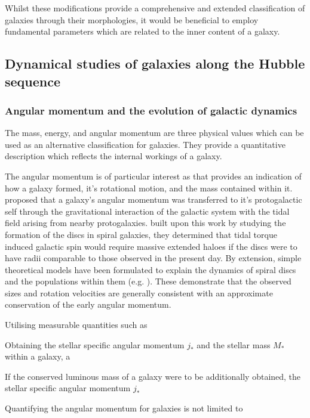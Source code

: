 \documentclass[12pt, twocolumn]{revtex4}    %
\begin{document}
Whilst these modifications provide a comprehensive and extended classification of galaxies through their morphologies, it would be beneficial to employ fundamental parameters which are related to the inner content of a galaxy.

\vspace{4ex}
\subsection{Dynamical studies of galaxies along the Hubble sequence}
\subsubsection{Angular momentum and the evolution of galactic dynamics}
\noindent
The mass, energy, and angular momentum are three physical values which can be used as an alternative classification for galaxies. They provide a quantitative description which reflects the internal workings of a galaxy.

The angular momentum is of particular interest as that provides an indication of how a galaxy formed, it's rotational motion, and the mass contained within it. \cite{1969ApJ...155..393P} proposed that a galaxy's angular momentum was transferred to it's protogalactic self through the gravitational interaction of the galactic system with the tidal field arising from nearby protogalaxies. \cite{1980MNRAS.193..189F} built upon this work by studying the formation of the discs in spiral galaxies, they determined that tidal torque induced galactic spin would require massive extended haloes if the discs were to have radii comparable to those observed in the present day. By extension, simple theoretical models have been formulated to explain the dynamics of spiral discs and the populations within them (e.g. \citealt{1998MNRAS.295..319M, 1997ApJ...482..659D}). These demonstrate that the observed sizes and rotation velocities are generally consistent with an approximate conservation of the early angular momentum. 

Utilising measurable quantities such as 

Obtaining the stellar specific angular momentum $j_*$ and the stellar mass $M_*$ within a galaxy, a 

If the conserved luminous mass of a galaxy were to be additionally obtained, the stellar specific angular momentum $j_*$

Quantifying the angular momentum for galaxies is not limited to 
\end{document}
